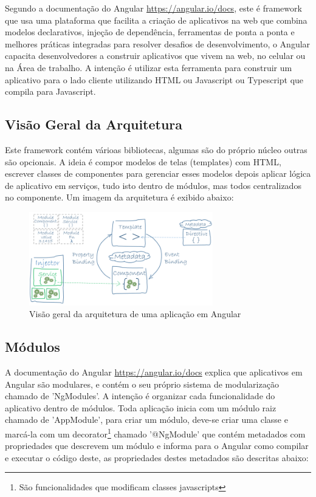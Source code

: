 Segundo a documentação do Angular \url{https://angular.io/docs}, este é framework que usa uma plataforma que facilita a criação de aplicativos na web que combina modelos declarativos, injeção de dependência, ferramentas de ponta a ponta e melhores práticas integradas para resolver desafios de desenvolvimento, o Angular capacita desenvolvedores a construir aplicativos que vivem na web, no celular ou na Área de trabalho. A intenção é utilizar esta ferramenta para construir um aplicativo para o lado cliente utilizando HTML ou Javascript ou Typescript que compila para Javascript.

\subsection{Visão Geral da Arquitetura}
Este framework contém várioas bibliotecas, algumas são do próprio núcleo outras são opcionais. A ideia é compor modelos de telas (templates) com HTML, escrever classes de componentes para gerenciar esses modelos depois aplicar lógica de aplicativo em serviços, tudo isto dentro de módulos, mas todos centralizados no componente. Um imagem da arquitetura é exibido abaixo: 

\begin{figure}[!h]
\centering
\includegraphics[width=8cm]{Figuras/Cap2/OverviewAngular.png}
\caption[]{Visão geral da arquitetura de uma aplicação em Angular}
\end{figure}

\subsection{Módulos}
A documentação do Angular \url{https://angular.io/docs} explica que aplicativos em Angular são modulares, e contém o seu próprio sistema de modularização chamado de 'NgModules'. A intenção é organizar cada funcionalidade do aplicativo dentro de módulos.
Toda aplicação inicia com um módulo raiz chamado de 'AppModule', para criar um módulo, deve-se criar uma classe e marcá-la com um decorator\footnote{São funcionalidades que modificam classes javascripts} chamado '@NgModule' que contém metadados com propriedades que descrevem um módulo e informa para o Angular como compilar e executar o código deste, as propriedades destes metadados são descritas abaixo:

